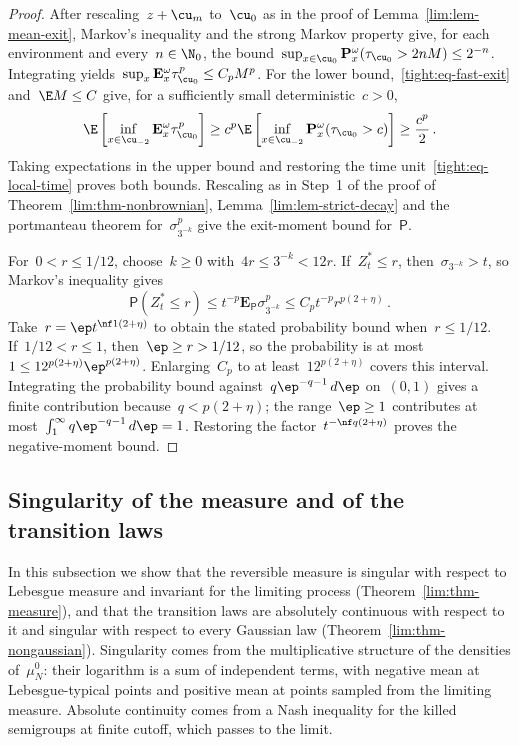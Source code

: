 \documentclass[11pt]{amsart}
\begin{document}
\begin{proof}
After rescaling~$z+\cu_m$ to~$\cu_0$ as in the proof of Lemma~\ref{lim:lem-mean-exit}, Markov's inequality and the strong Markov property give, for each environment and every~$n\in\N_0$, the bound~$\sup_{x\in\cu_0}\mathbf P_x^\omega(\tau_{\cu_0}>2nM)\leq2^{-n}$. Integrating yields~$\sup_x\mathbf E_x^\omega\tau_{\cu_0}^p\leq C_pM^p$. For the lower bound,~\eqref{tight:eq-fast-exit} and~$\E M\leq C$ give, for a sufficiently small deterministic~$c>0$,
\begin{equation*}
	\E\left[\inf_{x\in\cu_{-2}}\mathbf E_x^\omega\tau_{\cu_0}^p\right]
	\geq c^p\E\left[\inf_{x\in\cu_{-2}}\mathbf P_x^\omega(\tau_{\cu_0}>c)\right]
	\geq\frac{c^p}2\,.
\end{equation*}
Taking expectations in the upper bound and restoring the time unit~\eqref{tight:eq-local-time} proves both bounds. Rescaling as in Step~1 of the proof of Theorem~\ref{lim:thm-nonbrownian}, Lemma~\ref{lim:lem-strict-decay} and the portmanteau theorem for~$\sigma_{3^{-k}}^p$ give the exit-moment bound for~$\mathsf P$.

\smallskip

For~$0<r\leq1/12$, choose~$k\geq0$ with~$4r\leq3^{-k}<12r$. If~$Z_t^*\leq r$, then~$\sigma_{3^{-k}}>t$, so Markov's inequality gives
\begin{equation*}
	\mathsf P(Z_t^*\leq r)
	\leq t^{-p}\mathbf E_{\mathsf P}\sigma_{3^{-k}}^p
	\leq C_pt^{-p}r^{p(2+\eta)}\,.
\end{equation*}
Take~$r=\ep t^{\nf1{(2+\eta)}}$ to obtain the stated probability bound when~$r\leq1/12$. If~$1/12<r\leq1$, then~$\ep\geq r>1/12$, so the probability is at most~$1\leq12^{p(2+\eta)}\ep^{p(2+\eta)}$. Enlarging~$C_p$ to at least~$12^{p(2+\eta)}$ covers this interval. Integrating the probability bound against~$q\ep^{-q-1}\,d\ep$ on~$(0,1)$ gives a finite contribution because~$q<p(2+\eta)$; the range~$\ep\geq1$ contributes at most~$\int_1^\infty q\ep^{-q-1}\,d\ep=1$. Restoring the factor~$t^{-\nf q{(2+\eta)}}$ proves the negative-moment bound.
\end{proof}

\subsection{Singularity of the measure and of the transition laws}
\label{lim:sec-singularity}

In this subsection we show that the reversible measure is singular with respect to Lebesgue measure and invariant for the limiting process (Theorem~\ref{lim:thm-measure}), and that the transition laws are absolutely continuous with respect to it and singular with respect to every Gaussian law (Theorem~\ref{lim:thm-nongaussian}). Singularity comes from the multiplicative structure of the densities of~$\mu_N^0$: their logarithm is a sum of independent terms, with negative mean at Lebesgue-typical points and positive mean at points sampled from the limiting measure. Absolute continuity comes from a Nash inequality for the killed semigroups at finite cutoff, which passes to the limit.
\end{document}
